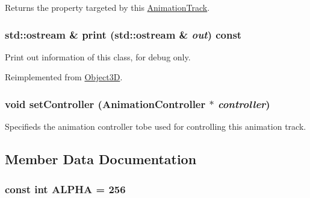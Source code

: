 Returns the property targeted by this \hyperlink{classm3g_1_1AnimationTrack}{AnimationTrack}. \hypertarget{classm3g_1_1AnimationTrack_6fea17fa1532df3794f8cb39cb4f911f}{
\subsubsection[{print}]{\setlength{\rightskip}{0pt plus 5cm}std::ostream \& print (std::ostream \& {\em out}) const}}
\label{classm3g_1_1AnimationTrack_6fea17fa1532df3794f8cb39cb4f911f}


Print out information of this class, for debug only. 

Reimplemented from \hyperlink{classm3g_1_1Object3D_6fea17fa1532df3794f8cb39cb4f911f}{Object3D}.\hypertarget{classm3g_1_1AnimationTrack_639279dfdc74095fcb28d0c25aeec6df}{
\subsubsection[{setController}]{\setlength{\rightskip}{0pt plus 5cm}void setController ({\bf AnimationController} $\ast$ {\em controller})}}
\label{classm3g_1_1AnimationTrack_639279dfdc74095fcb28d0c25aeec6df}


Specifieds the animation controller tobe used for controlling this animation track. 

\subsection{Member Data Documentation}
\hypertarget{classm3g_1_1AnimationTrack_417581fcde4067111f47320edb2aa378}{
\subsubsection[{ALPHA}]{\setlength{\rightskip}{0pt plus 5cm}const int {\bf ALPHA} = 256}}
\label{classm3g_1_1AnimationTrack_417581fcde4067111f47320edb2aa378}


